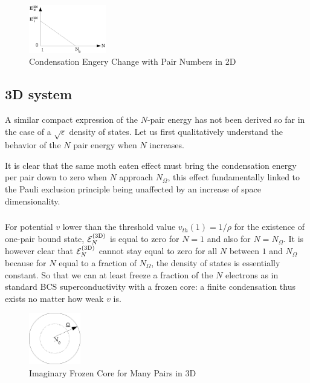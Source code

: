 \documentclass[aps,prb,showpacs,reprint]{revtex4-1}
\begin{document}
\begin{figure}[htbp]
	\centering
		\includegraphics[width=0.30\textwidth]{2dCondEnergy.eps}
	\caption{Condensation Engery Change  with Pair Numbers in 2D}
	\label{fig:2dCondEnergy}
\end{figure}



\subsection{3D system}
A similar compact expression of the $N$-pair energy has not been derived so far in the case of a $\sqrt{\epsilon}$ density of states. Let us first qualitatively understand the behavior of the $N$ pair energy when $N$ increases. 

It is clear that the same moth eaten effect must bring the condensation energy per pair down to zero when $N$ approach $N_\Omega$, this effect fundamentally linked to the Pauli exclusion principle being unaffected by an increase of space dimensionality. 

\subsubsection{}
For potential $v$ lower than the threshold value $v_{th}(1)=1/\rho$ for the existence of one-pair bound state, $\mathcal{E}_N^{{\text{(3D)}}}$ is equal to zero for $N=1$ and also for $N=N_\Omega$.  It is however clear that $\mathcal{E}_N^{{\text{(3D)}}}$ cannot stay equal to zero for all $N$ between $1$ and $N_\Omega$ because for $N$ equal to a fraction of $N_\Omega$, the density of states is essentially constant.  So that we can at least freeze a fraction of the $N$ electrons as in standard BCS superconductivity with a frozen core: a finite condensation thus exists no matter how weak $v$ is. 

\begin{figure}[htbp]
	\centering
		\includegraphics[width=0.20\textwidth]{potential.eps}
	\caption{Imaginary Frozen Core for Many Pairs in 3D}
	\label{fig:potential}
\end{figure}
\end{document}

